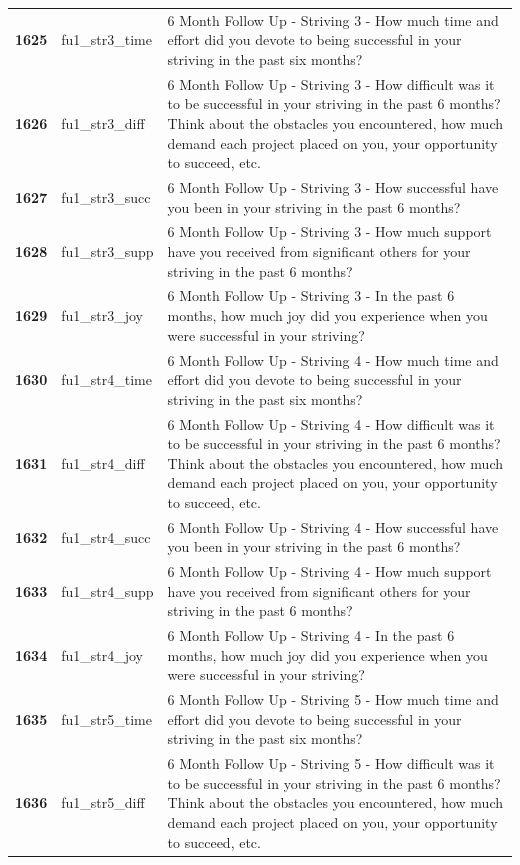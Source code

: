 \documentclass[
  letterpaper,
  DIV=11,
  numbers=noendperiod]{scrartcl}
\begin{document}
\begin{longtable}[t]{>{}cll}
\textbf{1625} & fu1\_str3\_time & 6 Month Follow Up - Striving 3 - How much time and effort did you devote to being successful in your striving in the past six months?\\
\addlinespace
\textbf{1626} & fu1\_str3\_diff & 6 Month Follow Up - Striving 3 - How difficult was it to be successful in your striving in the past 6 months? Think about the obstacles you encountered, how much demand each project placed on you, your opportunity to succeed, etc.\\
\textbf{1627} & fu1\_str3\_succ & 6 Month Follow Up - Striving 3 - How successful have you been in your striving in the past 6 months?\\
\textbf{1628} & fu1\_str3\_supp & 6 Month Follow Up - Striving 3 - How much support have you received from significant others for your striving in the past 6 months?\\
\textbf{1629} & fu1\_str3\_joy & 6 Month Follow Up - Striving 3 - In the past 6 months, how much joy did you experience when you were successful in your striving?\\
\textbf{1630} & fu1\_str4\_time & 6 Month Follow Up - Striving 4 - How much time and effort did you devote to being successful in your striving in the past six months?\\
\addlinespace
\textbf{1631} & fu1\_str4\_diff & 6 Month Follow Up - Striving 4 - How difficult was it to be successful in your striving in the past 6 months? Think about the obstacles you encountered, how much demand each project placed on you, your opportunity to succeed, etc.\\
\textbf{1632} & fu1\_str4\_succ & 6 Month Follow Up - Striving 4 - How successful have you been in your striving in the past 6 months?\\
\textbf{1633} & fu1\_str4\_supp & 6 Month Follow Up - Striving 4 - How much support have you received from significant others for your striving in the past 6 months?\\
\textbf{1634} & fu1\_str4\_joy & 6 Month Follow Up - Striving 4 - In the past 6 months, how much joy did you experience when you were successful in your striving?\\
\textbf{1635} & fu1\_str5\_time & 6 Month Follow Up - Striving 5 - How much time and effort did you devote to being successful in your striving in the past six months?\\
\addlinespace
\textbf{1636} & fu1\_str5\_diff & 6 Month Follow Up - Striving 5 - How difficult was it to be successful in your striving in the past 6 months? Think about the obstacles you encountered, how much demand each project placed on you, your opportunity to succeed, etc.\\

\end{longtable}
\end{document}
